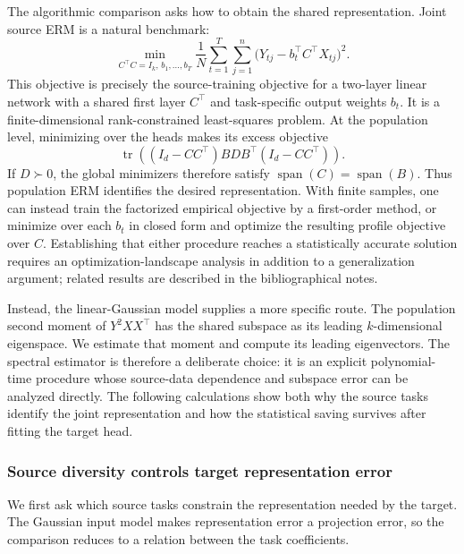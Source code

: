 \documentclass[11pt,twoside]{article}
\theoremstyle{definition}
\theoremstyle{remark}
\begin{document}
The algorithmic comparison asks how to obtain the shared representation. Joint
source ERM is a natural benchmark:
\begin{equation*}
 \min_{C^\top C=I_k,\,b_1,\ldots,b_T}
 \frac1N\sum_{t=1}^T\sum_{j=1}^n
 \bigl(Y_{tj}-b_t^\top C^\top X_{tj}\bigr)^2.
\end{equation*}
This objective is precisely the source-training objective for a two-layer
linear network with a shared first layer $C^\top$ and task-specific output
weights $b_t$. It is a finite-dimensional rank-constrained least-squares
problem. At the population level, minimizing over the heads makes its excess
objective
\[
 \operatorname{tr}\!\left((I_d-CC^\top)BDB^\top
                           (I_d-CC^\top)\right).
\]
If $D\succ0$, the global minimizers therefore satisfy
$\operatorname{span}(C)=\operatorname{span}(B)$. Thus population ERM identifies
the desired representation. With finite samples, one can instead train the
factorized empirical objective by a first-order method, or minimize over each
$b_t$ in closed form and optimize the resulting profile objective over
$C$. Establishing that either procedure reaches a statistically accurate
solution requires an optimization-landscape analysis in addition to a
generalization argument; related results are described in the bibliographical
notes.

Instead, the linear-Gaussian model supplies a more specific route. The
population second moment of $Y^2XX^\top$ has the shared subspace as its leading
$k$-dimensional eigenspace. We estimate that moment and compute its leading
eigenvectors. The spectral estimator is therefore a deliberate choice: it is
an explicit polynomial-time procedure whose source-data dependence and
subspace error can be analyzed directly. The following calculations show both
why the source tasks identify the joint representation and how the statistical
saving survives after fitting the target head.

\subsubsection{Source diversity controls target representation error}

We first ask which source tasks constrain the representation needed by the
target. The Gaussian input model makes representation error a projection
error, so the comparison reduces to a relation between the task coefficients.
\end{document}
